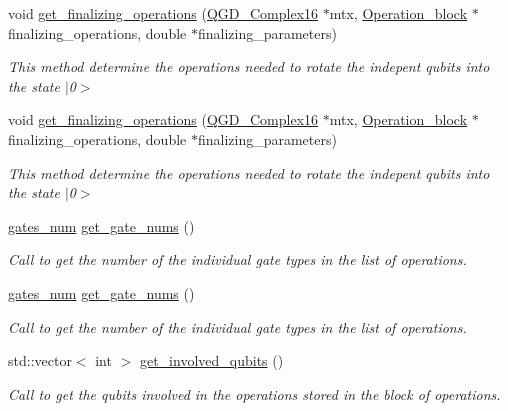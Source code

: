 \begin{DoxyCompactItemize}
void \hyperlink{class_decomposition___base_a9832cc5308c00b73d3e6bc331a77c7f7}{get\+\_\+finalizing\+\_\+operations} (\hyperlink{struct_q_g_d___complex16}{Q\+G\+D\+\_\+\+Complex16} $\ast$mtx, \hyperlink{class_operation__block}{Operation\+\_\+block} $\ast$finalizing\+\_\+operations, double $\ast$finalizing\+\_\+parameters)
\begin{DoxyCompactList}\small\item\em This method determine the operations needed to rotate the indepent qubits into the state $\vert$0$>$ \end{DoxyCompactList}\item 
void \hyperlink{class_decomposition___base_a9832cc5308c00b73d3e6bc331a77c7f7}{get\+\_\+finalizing\+\_\+operations} (\hyperlink{struct_q_g_d___complex16}{Q\+G\+D\+\_\+\+Complex16} $\ast$mtx, \hyperlink{class_operation__block}{Operation\+\_\+block} $\ast$finalizing\+\_\+operations, double $\ast$finalizing\+\_\+parameters)
\begin{DoxyCompactList}\small\item\em This method determine the operations needed to rotate the indepent qubits into the state $\vert$0$>$ \end{DoxyCompactList}\item 
\hyperlink{structgates__num}{gates\+\_\+num} \hyperlink{class_operation__block_ac39ab782da3e34c8ec4acf6181fbc5f7}{get\+\_\+gate\+\_\+nums} ()
\begin{DoxyCompactList}\small\item\em Call to get the number of the individual gate types in the list of operations. \end{DoxyCompactList}\item 
\hyperlink{structgates__num}{gates\+\_\+num} \hyperlink{class_operation__block_ac39ab782da3e34c8ec4acf6181fbc5f7}{get\+\_\+gate\+\_\+nums} ()
\begin{DoxyCompactList}\small\item\em Call to get the number of the individual gate types in the list of operations. \end{DoxyCompactList}\item 
std\+::vector$<$ int $>$ \hyperlink{class_operation__block_a92e4f0566e4b36830652729377a8e936}{get\+\_\+involved\+\_\+qubits} ()
\begin{DoxyCompactList}\small\item\em Call to get the qubits involved in the operations stored in the block of operations. \end{DoxyCompactList}\item 

\end{DoxyCompactItemize}
